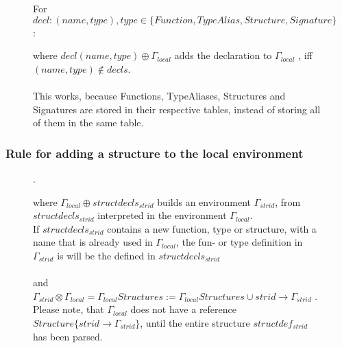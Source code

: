 \begin{figure}\label{Rule4}
  \begin{tcolorbox}
    For $decl : (name, type) , type \in \{Function, TypeAlias, Structure, Signature \}$:
    \begin{prooftree}
    \end{prooftree}
      where $decl (name, type) \oplus \Gamma_{local}$ adds the declaration to
      $\Gamma_{local}$ , iff $(name, type) \not\in decls$.
      \\
      \\
      This works, because Functions, TypeAliases, Structures and Signatures are
      stored in their respective tables, instead of storing all of them in the
      same table.
  \end{tcolorbox}
\end{figure}

\subsubsection{Rule for adding a structure to the local environment}
\begin{figure}\label{Rule3}
  \begin{tcolorbox}
    \begin{prooftree}
    \end{prooftree}.

      where $\Gamma_{local} \oplus structdecls_{strid}$ builds an environment
      $\Gamma_{strid}$, from $structdecls_{strid}$ interpreted in the environment
      $\Gamma_{local}$.\\
      If $structdecls_{strid}$ contains a new function, type or
      structure, with a name that is already used in $\Gamma_{local}$, the fun- or
      type definition in $\Gamma_{strid}$ is will be the defined in $structdecls_{strid}$
      \\
      \\
      and
      $\Gamma_{strid} \otimes \Gamma_{local} = \Gamma_{local} Structures := \Gamma_{local} Structures \cup {strid \to \Gamma_{strid}}$ .\\
      Please note, that $\Gamma_{local}$ does not have a reference
      $Structure\{strid \to \Gamma_{strid}\}$, until the entire structure $structdef_{strid}$ has been parsed.
  \end{tcolorbox}
\end{figure}

